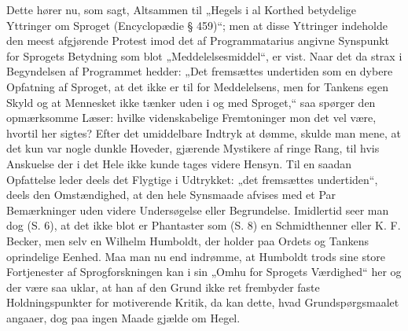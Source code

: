 \documentclass[12pt]{book}
\begin{document}
Dette hører nu, som sagt, Altsammen til „Hegels i
al Korthed betydelige Yttringer om Sproget (Encyclopædie
§ 459)“; men at disse Yttringer indeholde den meest afgjørende
Protest imod det af Programmatarius angivne Synspunkt for
Sprogets Betydning som blot „Meddelelsesmiddel“, er vist.
Naar det da strax i Begyndelsen af Programmet hedder: „Det
fremsættes undertiden som en dybere Opfatning af Sproget,
at det ikke er til for Meddelelsens, men for Tankens egen
Skyld og at Mennesket ikke tænker uden i og med Sproget,“
saa spørger den opmærksomme Læser: hvilke videnskabelige
Fremtoninger mon det vel være, hvortil her sigtes? Efter det
umiddelbare Indtryk at dømme, skulde man mene, at det kun var
nogle dunkle Hoveder, gjærende Mystikere af ringe Rang,
til hvis Anskuelse der i det Hele ikke kunde tages videre Hensyn.
Til en saadan Opfattelse leder deels det Flygtige i Udtrykket:
„det fremsættes undertiden“, deels den Omstændighed, at den
hele Synsmaade afvises med et Par Bemærkninger uden
videre Undersøgelse eller Begrundelse. Imidlertid seer man
dog (S. 6), at det ikke blot er Phantaster som (S. 8) en
Schmidthenner eller K. F. Becker, men selv en Wilhelm
Humboldt, der holder paa Ordets og Tankens oprindelige
Eenhed. Maa man nu end indrømme, at Humboldt trods sine
store Fortjenester af Sprogforskningen kan i sin „Omhu for
Sprogets Værdighed“ her og der være saa uklar, at han af den
Grund ikke ret frembyder faste Holdningspunkter for motiverende
Kritik, da kan dette, hvad Grundspørgsmaalet angaaer,
dog paa ingen Maade gjælde om Hegel.
\end{document}
